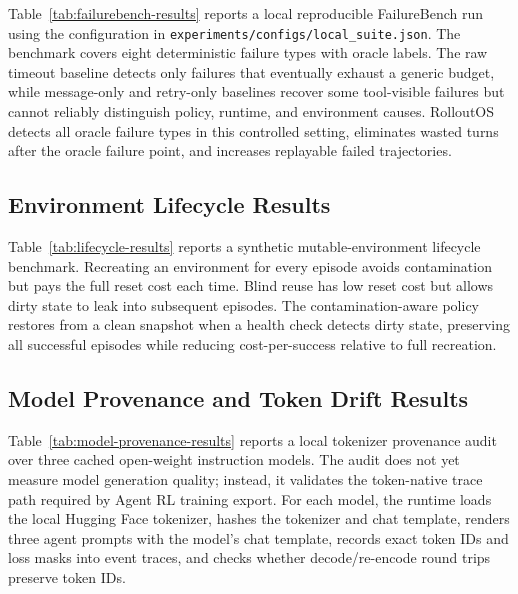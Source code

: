 \documentclass{article}
\newcommand{\sys}{RolloutOS}
\begin{document}
Table~\ref{tab:failurebench-results} reports a local reproducible FailureBench run
using the configuration in \texttt{experiments/configs/local\_suite.json}.
The benchmark covers eight deterministic failure types with oracle labels.
The raw timeout baseline detects only failures that eventually exhaust a generic
budget, while message-only and retry-only baselines recover some tool-visible
failures but cannot reliably distinguish policy, runtime, and environment causes.
\sys{} detects all oracle failure types in this controlled setting, eliminates
wasted turns after the oracle failure point, and increases replayable failed
trajectories.

\begin{table}[t]
\centering
\scriptsize
\resizebox{\linewidth}{!}{%

}
\caption{FailureBench detection and resource-cost results. Failed cost is measured
in deterministic synthetic resource units, not wall-clock time.}
\label{tab:failurebench-results}
\end{table}

\subsection{Environment Lifecycle Results}

Table~\ref{tab:lifecycle-results} reports a synthetic mutable-environment
lifecycle benchmark. Recreating an environment for every episode avoids
contamination but pays the full reset cost each time. Blind reuse has low reset
cost but allows dirty state to leak into subsequent episodes. The
contamination-aware policy restores from a clean snapshot when a health check
detects dirty state, preserving all successful episodes while reducing
cost-per-success relative to full recreation.

\begin{table}[t]
\centering
\scriptsize
\resizebox{\linewidth}{!}{%

}
\caption{Synthetic environment lifecycle benchmark. Cost is measured in
deterministic reset/restore/step units.}
\label{tab:lifecycle-results}
\end{table}

\subsection{Model Provenance and Token Drift Results}

Table~\ref{tab:model-provenance-results} reports a local tokenizer provenance
audit over three cached open-weight instruction models. The audit does not yet
measure model generation quality; instead, it validates the token-native trace
path required by Agent RL training export. For each model, the runtime loads the
local Hugging Face tokenizer, hashes the tokenizer and chat template, renders
three agent prompts with the model's chat template, records exact token IDs and
loss masks into event traces, and checks whether decode/re-encode round trips
preserve token IDs.
\end{document}
